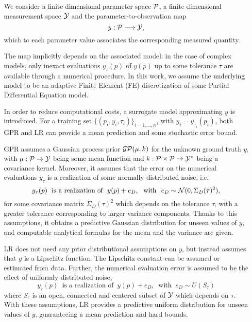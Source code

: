 We consider a finite dimensional parameter space $\mathcal P$, a finite dimensional measurement space $ \mathcal Y$ and the parameter-to-observation map 
\[
 y : \mathcal P \longrightarrow \mathcal Y, 
\]
which to each parameter value associates the corresponding measured quantity.

The map implicitly depends on the associated model: in the case of complex models, only inexact evaluations $y_\tau (p) $ of $ y(p)$ up to some tolerance $\tau$ are available through a numerical procedure. 
In this work, we assume the underlying model to be an adaptive Finite Element (FE) discretization of some Partial Differential Equation model. 

In order to reduce computational costs, a surrogate model approximating $y$ is introduced.
For a training set $\{(p_i,y_i,\tau_i)\}_{i=1,\dots,n}$, with $y_i = y_{\tau_i}(p_i)$, both GPR and LR can provide a mean prediction and some stochastic error bound. 

GPR assumes a Gaussian process prior $\mathcal G \mathcal P (\mu, k)$ for the unknown ground truth $y$, with $\mu : \mathcal P \rightarrow \mathcal Y$ being some mean function and $k: \mathcal P \times \mathcal P \rightarrow \mathcal Y^* $ being a covariance kernel.
Moreover, it assumes that the error on the numerical evaluations $y_\tau$ is a realization of some normally distributed noise, i.e. 
\begin{equation}\label{eq:GPR-noise}
    y_\tau(p) \ \text{ is a realization of } \ y(p) + e_D,  \ \text{ with } \ e_D \sim \mathcal N (0, \Sigma_D(\tau)^2),    
\end{equation}
for some covariance matrix $\Sigma_D(\tau)^2$ which depends on the tolerance $\tau$, with a greater tolerance corresponding to larger variance components.
Thanks to this assumptions, it obtains a predictive Gaussian distribution for unseen values of $y$, and computable analytical formulas for the mean and the variance are given.

LR does not need any prior distributional assumptions on $y$, but instead assumes that $y$ is a Lipschitz function.
The Lipschitz constant can be assumed or estimated from data.
Further, the numerical evaluation error is assumed to be the effect of uniformly distributed noise,  
\begin{equation}\label{eq:LR-noise}
    y_\tau(p) \ \text{ is a realization of } \ y(p) + e_D,  \ \text{ with } \ e_D \sim U(S_\tau )    
\end{equation}
where $S_\tau$ is an open, connected and centered subset of $\mathcal Y$ which depends on $\tau$.
With these assumptions, LR provides a predictive uniform distribution for unseen values of $y$, guaranteeing a mean prediction and hard bounds.


